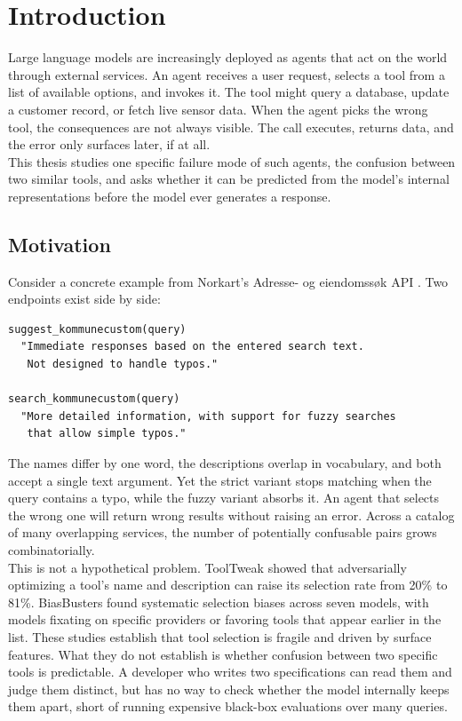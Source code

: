 \chapter{Introduction}
\label{ch:intro}

Large language models are increasingly deployed as agents that act on the world through external services.
An agent receives a user request, selects a tool from a list of available options, and invokes it.
The tool might query a database, update a customer record, or fetch live sensor data.
When the agent picks the wrong tool, the consequences are not always visible.
The call executes, returns data, and the error only surfaces later, if at all. \\

This thesis studies one specific failure mode of such agents, the confusion between two similar tools, and asks whether it can be predicted from the model's internal representations before the model ever generates a response.

\section{Motivation}

Consider a concrete example from Norkart's Adresse- og eiendomssøk API \cite{norkart2026api}. Two endpoints exist side by side:

\begin{verbatim}
suggest_kommunecustom(query)
  "Immediate responses based on the entered search text.
   Not designed to handle typos."

search_kommunecustom(query)
  "More detailed information, with support for fuzzy searches
   that allow simple typos."
\end{verbatim}

The names differ by one word, the descriptions overlap in vocabulary, and both accept a single text argument.
Yet the strict variant stops matching when the query contains a typo, while the fuzzy variant absorbs it.
An agent that selects the wrong one will return wrong results without raising an error.
Across a catalog of many overlapping services, the number of potentially confusable pairs grows combinatorially. \\

This is not a hypothetical problem.
ToolTweak \cite{sneh2025tooltweak} showed that adversarially optimizing a tool's name and description can raise its selection rate from 20\% to 81\%. BiasBusters \cite{blankenstein2025biasbusters} found systematic selection biases across seven models, with models fixating on specific providers or favoring tools that appear earlier in the list.
These studies establish that tool selection is fragile and driven by surface features.
What they do not establish is whether confusion between two specific tools is predictable.
A developer who writes two specifications can read them and judge them distinct, but has no way to check whether the model internally keeps them apart, short of running expensive black-box evaluations over many queries. \\

